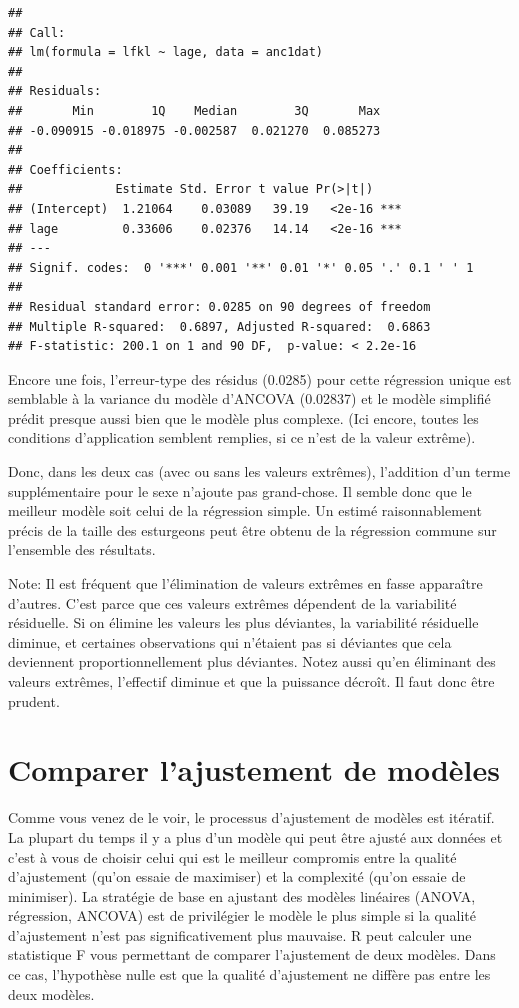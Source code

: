 \documentclass[12pt,]{book}
\begin{document}
\begin{verbatim}
## 
## Call:
## lm(formula = lfkl ~ lage, data = anc1dat)
## 
## Residuals:
##       Min        1Q    Median        3Q       Max 
## -0.090915 -0.018975 -0.002587  0.021270  0.085273 
## 
## Coefficients:
##             Estimate Std. Error t value Pr(>|t|)    
## (Intercept)  1.21064    0.03089   39.19   <2e-16 ***
## lage         0.33606    0.02376   14.14   <2e-16 ***
## ---
## Signif. codes:  0 '***' 0.001 '**' 0.01 '*' 0.05 '.' 0.1 ' ' 1
## 
## Residual standard error: 0.0285 on 90 degrees of freedom
## Multiple R-squared:  0.6897, Adjusted R-squared:  0.6863 
## F-statistic: 200.1 on 1 and 90 DF,  p-value: < 2.2e-16
\end{verbatim}

Encore une fois, l'erreur-type des résidus (0.0285) pour cette régression unique est semblable à la variance du modèle d'ANCOVA (0.02837) et le modèle simplifié prédit presque aussi bien que le modèle plus complexe. (Ici encore, toutes les conditions d'application semblent remplies, si ce n'est de la valeur extrême).

Donc, dans les deux cas (avec ou sans les valeurs extrêmes), l'addition d'un terme supplémentaire pour le sexe n'ajoute pas grand-chose. Il semble donc que le meilleur modèle soit celui de la régression simple. Un estimé raisonnablement précis de la taille des esturgeons peut être obtenu de la régression commune sur l'ensemble des résultats.

Note: Il est fréquent que l'élimination de valeurs extrêmes en fasse apparaître d'autres. C'est parce que ces valeurs extrêmes dépendent de la variabilité résiduelle. Si on élimine les valeurs les plus déviantes, la variabilité résiduelle diminue, et certaines observations qui n'étaient pas si déviantes que cela deviennent proportionnellement plus déviantes. Notez aussi qu'en éliminant des valeurs extrêmes, l'effectif diminue et que la puissance décroît. Il faut donc être prudent.

\hypertarget{comparer-lajustement-de-moduxe8les}{%
\section{Comparer l'ajustement de modèles}\label{comparer-lajustement-de-moduxe8les}}

Comme vous venez de le voir, le processus d'ajustement de modèles est itératif. La plupart du temps il y a plus d'un modèle qui peut être ajusté aux données et c'est à vous de choisir celui qui est le meilleur compromis entre la qualité d'ajustement (qu'on essaie de maximiser) et la complexité (qu'on essaie de minimiser). La stratégie de base en ajustant des modèles linéaires (ANOVA, régression, ANCOVA) est de privilégier le modèle le plus simple si la qualité d'ajustement n'est pas significativement plus mauvaise. R peut calculer une statistique F vous permettant de comparer l'ajustement de deux modèles. Dans ce cas, l'hypothèse nulle est que la qualité d'ajustement ne diffère pas entre les deux modèles.
\end{document}
